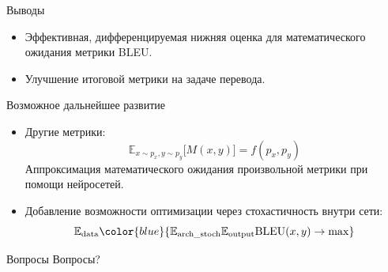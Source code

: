\documentclass{beamer}					%
\begin{document}
    \begin{frame}{Выводы}
        \begin{itemize}
            \item Эффективная, дифференцируемая нижняя оценка для математического ожидания метрики BLEU.
            \item Улучшение итоговой метрики на задаче перевода.
        \end{itemize}
    \end{frame}
    \begin{frame}{Возможное дальнейшее развитие}
        \begin{itemize}
            \item  Другие метрики:
            $$\mathbb{E}_{x\sim p_x,y\sim p_y} \lbrack  M(x, y) \rbrack=f(p_x, p_y)$$
            Аппроксимация математического ожидания произвольной метрики при помощи нейросетей.
            \item Добавление возможности оптимизации через стохастичность внутри сети:
            $$\mathbb{E}_{\mathrm{data}}\color{blue}{ \mathbb{E}_{\mathrm{arch\_stoch}}  \mathbb{E}_{\mathrm{output}} \textnormal{BLEU}(x, y) \to \max} $$
        \end{itemize}
    \end{frame}

    \begin{frame}{Вопросы}
        \Large{Вопросы?}
    \end{frame}

    
\end{document}
